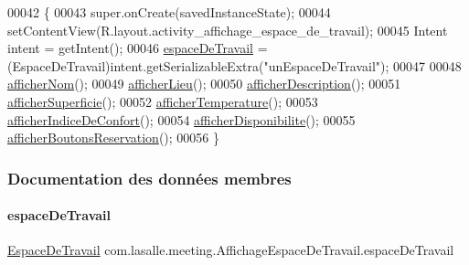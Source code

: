 \begin{DoxyCode}
00042     \{
00043         super.onCreate(savedInstanceState);
00044         setContentView(R.layout.activity\_affichage\_espace\_de\_travail);
00045         Intent intent = getIntent();
00046         \hyperlink{classcom_1_1lasalle_1_1meeting_1_1_affichage_espace_de_travail_a934d41c1c41882b94b65a95cee5aca13}{espaceDeTravail} = (EspaceDeTravail)intent.getSerializableExtra(\textcolor{stringliteral}{"unEspaceDeTravail"});
00047 
00048         \hyperlink{classcom_1_1lasalle_1_1meeting_1_1_affichage_espace_de_travail_a62159c3fd69a3d4f03306bd3e75c09ce}{afficherNom}();
00049         \hyperlink{classcom_1_1lasalle_1_1meeting_1_1_affichage_espace_de_travail_a86fc32986ef9ae8f6ef7fca78d91f648}{afficherLieu}();
00050         \hyperlink{classcom_1_1lasalle_1_1meeting_1_1_affichage_espace_de_travail_a4afb30e3faf37f738f6261fc0696d62b}{afficherDescription}();
00051         \hyperlink{classcom_1_1lasalle_1_1meeting_1_1_affichage_espace_de_travail_ae8f1d5cb6d99aced1996b1b2bbcebe26}{afficherSuperficie}();
00052         \hyperlink{classcom_1_1lasalle_1_1meeting_1_1_affichage_espace_de_travail_a9474bdc380c78e632cc8d384d7393f50}{afficherTemperature}();
00053         \hyperlink{classcom_1_1lasalle_1_1meeting_1_1_affichage_espace_de_travail_acd704eb42f942a10a118d872ffe779a3}{afficherIndiceDeConfort}();
00054         \hyperlink{classcom_1_1lasalle_1_1meeting_1_1_affichage_espace_de_travail_a597703fc6f7e82b79ac7047640fa9323}{afficherDisponibilite}();
00055         \hyperlink{classcom_1_1lasalle_1_1meeting_1_1_affichage_espace_de_travail_a01e3d2585c84043dbe5086a2fc81c371}{afficherBoutonsReservation}();
00056     \}
\end{DoxyCode}


\subsubsection{Documentation des données membres}
\mbox{\label{classcom_1_1lasalle_1_1meeting_1_1_affichage_espace_de_travail_a934d41c1c41882b94b65a95cee5aca13}} 
\paragraph{\texorpdfstring{espace\+De\+Travail}{espaceDeTravail}}
{\footnotesize\ttfamily \hyperlink{classcom_1_1lasalle_1_1meeting_1_1_espace_de_travail}{Espace\+De\+Travail} com.\+lasalle.\+meeting.\+Affichage\+Espace\+De\+Travail.\+espace\+De\+Travail\hspace{0.3cm}{\ttfamily [private]}}

